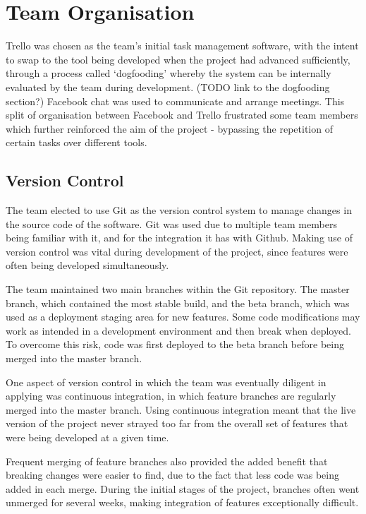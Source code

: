 \documentclass[a4paper]{l3proj}
\begin{document}
\chapter{Team Organisation}
\label{team}

Trello was chosen as the team’s initial task management software, with the intent to swap to the tool being developed when the project had advanced sufficiently, through a process called ‘dogfooding’ whereby the system can be internally evaluated by the team during development. (TODO link to the dogfooding section?)  Facebook chat was used to communicate and arrange meetings.  This split of organisation between Facebook and Trello frustrated some team members which further reinforced the aim of the project - bypassing the repetition of certain tasks over different tools. 


\section{Version Control}
\label{versionControl}

The team elected to use Git as the version control system to manage changes in the source code of the software. Git was used due to multiple team members being familiar with it, and for the integration it has with Github. Making use of version control was vital during development of the project, since features were often being developed simultaneously.

The team maintained two main branches within the Git repository. The master branch, which contained the most stable build, and the beta branch, which was used as a deployment staging area for new features. Some code modifications may work as intended in a development environment and then break when deployed. To overcome this risk, code was first deployed to the beta branch before being merged into the master branch.

One aspect of version control in which the team was eventually diligent in applying was continuous integration, in which feature branches are regularly merged into the master branch. Using continuous integration meant that the live version of the project never strayed too far from the overall set of features that were being developed at a given time. 

Frequent merging of feature branches also provided the added benefit that breaking changes were easier to find, due to the fact that less code was being added in each merge. During the initial stages of the project, branches often went unmerged for several weeks, making integration of features exceptionally difficult. 
\end{document}
